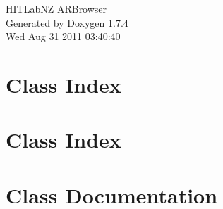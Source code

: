 \documentclass[a4paper]{book}
\begin{document}
\hypersetup{pageanchor=false}
\begin{titlepage}
\vspace*{7cm}
\begin{center}
{\Large HITLabNZ ARBrowser }\\
\vspace*{1cm}
{\large Generated by Doxygen 1.7.4}\\
\vspace*{0.5cm}
{\small Wed Aug 31 2011 03:40:40}\\
\end{center}
\end{titlepage}
\clearemptydoublepage
{}
\tableofcontents
\clearemptydoublepage
{}
\hypersetup{pageanchor=true}
\chapter{Class Index}

\chapter{Class Index}

\chapter{Class Documentation}















\printindex
\end{document}
